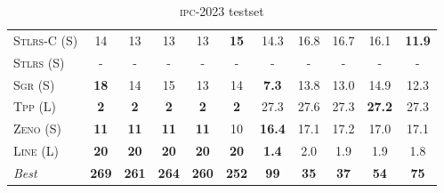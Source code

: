 \begin{table}[tb]
{\begin{tabular}{|l||ccccc||ccccc||}
\textsc{Stlrs-C} (S)&14&13&13&13&\textbf{15}&14.3&16.8&16.7&16.1&\textbf{11.9}\\
\textsc{Stlrs} (S)&-&-&-&-&-&-&-&-&-&-\\
\textsc{Sgr} (S)&\textbf{18}&14&15&13&14&\textbf{7.3}&13.8&13.0&14.9&12.3\\
\textsc{Tpp} (L)&\textbf{2}&\textbf{2}&\textbf{2}&\textbf{2}&\textbf{2}&27.3&27.6&27.3&\textbf{27.2}&27.3\\
\textsc{Zeno} (S)&\textbf{11}&\textbf{11}&\textbf{11}&\textbf{11}&10&\textbf{16.4}&17.1&17.2&17.0&17.1\\
\textsc{Line} (L)&\textbf{20}&\textbf{20}&\textbf{20}&\textbf{20}&\textbf{20}&\textbf{1.4}&2.0&1.9&1.9&1.8
\\\hline
\textit{Best}&\textbf{269}&\textbf{261}&\textbf{264}&\textbf{260}&\textbf{252}&\textbf{99}&\textbf{35}&\textbf{37}&\textbf{54}&\textbf{75}\\\hline

        \end{tabular}}
        \caption{\textsc{ipc}-2023 testset}
        \label{tab:ipc}
        \end{table}
        